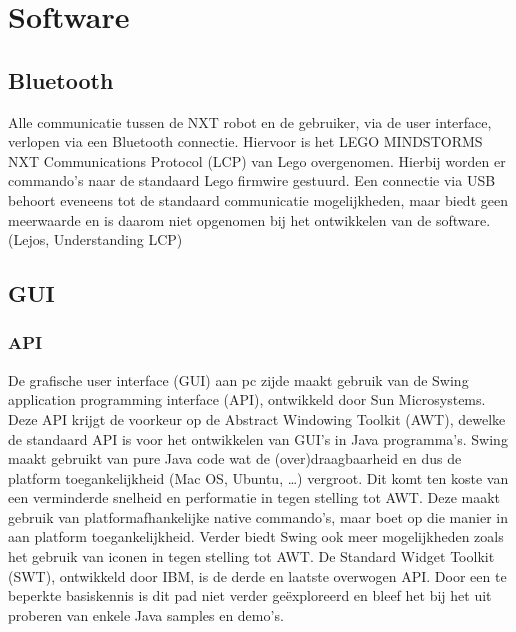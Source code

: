 \documentclass[tt1]{penoverslag}
\begin{document}
\section{Software}

\subsection{Bluetooth}
Alle communicatie tussen de NXT robot en de gebruiker,  via de user interface, verlopen via een Bluetooth connectie. Hiervoor is het LEGO MINDSTORMS NXT Communications Protocol (LCP) van Lego overgenomen. Hierbij worden er commando’s naar de standaard Lego firmwire gestuurd. Een connectie via USB behoort eveneens tot de standaard communicatie mogelijkheden, maar biedt geen meerwaarde en is daarom niet opgenomen bij het ontwikkelen van de software. (Lejos, Understanding LCP) \cite{lcp}

\subsection{GUI}
\subsubsection{API}
De grafische user interface (GUI) aan pc zijde maakt gebruik van de Swing application programming interface (API), ontwikkeld door Sun Microsystems. Deze API krijgt de voorkeur op de Abstract Windowing Toolkit (AWT), dewelke de standaard API is voor het ontwikkelen van GUI’s in Java programma’s. Swing maakt gebruikt van pure Java code wat de (over)draagbaarheid en dus de platform toegankelijkheid (Mac OS, Ubuntu, …) vergroot. Dit komt ten koste van een verminderde snelheid en performatie in tegen stelling tot AWT. Deze maakt gebruik van platformafhankelijke native commando’s, maar boet op die manier in aan platform toegankelijkheid. Verder biedt Swing ook meer mogelijkheden zoals het gebruik van iconen in tegen stelling tot AWT. De Standard Widget Toolkit (SWT), ontwikkeld door IBM,  is de derde en laatste overwogen API.  Door een te beperkte basiskennis is dit pad niet verder geëxploreerd en bleef het bij het uit proberen van enkele Java samples en demo’s. \cite{awtswing}
\end{document}
